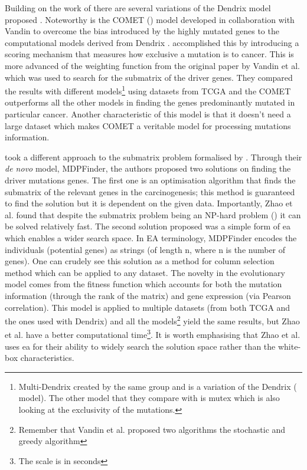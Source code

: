 Building on the work of \citet{Vandin2012-cf} there are several variations of the Dendrix model proposed \cite{Leiserson2013-da,Szczurek2014-dh,Leiserson2015-yk}. Noteworthy is the COMET (\citet{Leiserson2015-yk}) model developed in collaboration with Vandin to overcome the bias introduced by the highly mutated genes to the computational models derived from Dendrix \cite{Vandin2012-ns}. \citet{Leiserson2015-yk} accomplished this by introducing a scoring mechanism that measures how exclusive a mutation is to cancer. This is more advanced of the weighting function from the original paper by Vandin et al. which was used to search for the submatrix of the driver genes. They compared the results with different models\footnote{Multi-Dendrix\cite{Leiserson2013-da} created by the same group and is a variation of the Dendrix (\citet{Vandin2012-cf} model). The other model that they compare with is mutex\cite{Babur2015-qk} which is also looking at the exclusivity of the mutations.} using datasets from TCGA and the COMET outperforms all the other models\cite{Leiserson2013-da,Szczurek2014-dh} in finding the genes predominantly mutated in particular cancer. Another characteristic of this model is that it doesn’t need a large dataset which makes COMET a veritable model for processing mutations information.

\citet{Zhao2012-wj} took a different approach to the submatrix problem formalised by \citet{Vandin2012-cf}. Through their \textit{de novo} model, MDPFinder\cite{Zhao2012-wj}, the authors proposed two solutions on finding the driver mutations genes. The first one is an optimisation algorithm that finds the submatrix of the relevant genes in the carcinogenesis; this method is guaranteed to find the solution but it is dependent on the given data. Importantly, Zhao et al. found that despite the submatrix problem being an NP-hard problem (\citet{Vandin2012-cf}) it can be solved relatively fast. The second solution proposed was a simple form of \acrfull{ea} which enables a wider search space. In EA terminology, MDPFinder encodes the individuals (potential genes) as strings (of length n, where n is the number of genes). One can crudely see this solution as a method for column selection method which can be applied to any dataset. The novelty in the evolutionary model comes from the fitness function which accounts for both the mutation information (through the rank of the matrix) and gene expression (via Pearson correlation). This model is applied to multiple datasets (from both TCGA and the ones used with Dendrix\cite{Vandin2012-cf}) and all the models\footnote{Remember that Vandin et al. proposed two algorithms the stochastic and greedy algorithm} yield the same results, but Zhao et al. have a better computational time\footnote{The scale is in seconds}. It is worth emphasising that Zhao et al. uses \acrshort{ea} for their ability to widely search the solution space rather than the white-box characteristics.

